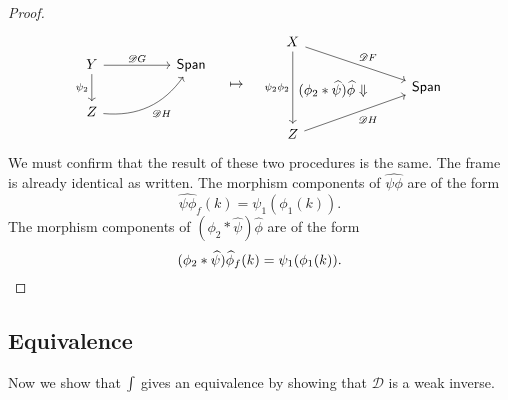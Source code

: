 \begin{proof}
\[\begin{tikzcd}
        Y
        \arrow[d, swap, "\psi_2"]
        \arrow[rr, "\mathscr DG"]
        &&
        \Span
        \\
        Z
        \arrow[urr, swap, "\mathscr DH", bend right]
    \end{tikzcd}
    \quad \mapsto \quad
    \begin{tikzcd}
        X
        \arrow[dd, "\psi_2 \phi_2", swap]
        \arrow[dd, phantom, "(\phi_2 \ast \widehat \psi) \widehat \phi \Downarrow", bend left = 100]
        \arrow[drrr, "\mathscr DF"]
        \\&&&
        \Span
        \\
        Z
        \arrow[urrr, swap, "\mathscr DH"]
    \end{tikzcd}
    \]
    We must confirm that the result of these two procedures is the same. The frame is already identical as written. The morphism components of $\widehat{\psi\phi}$ are of the form
    \[\widehat{\psi\phi}_f(k) = \psi_1(\phi_1(k)).\] 
    The morphism components of $(\phi_2\ast\widehat\psi)\widehat\phi$ are of the form
    \[(\phi_2\ast\widehat\psi)\widehat\phi_f(k) = \psi_1(\phi_1(k)).\qedhere \]
\end{proof}

\subsection*{Equivalence}

Now we show that $\textstyle{\int}$ gives an equivalence by showing that $\mathscr D$ is a weak inverse.

